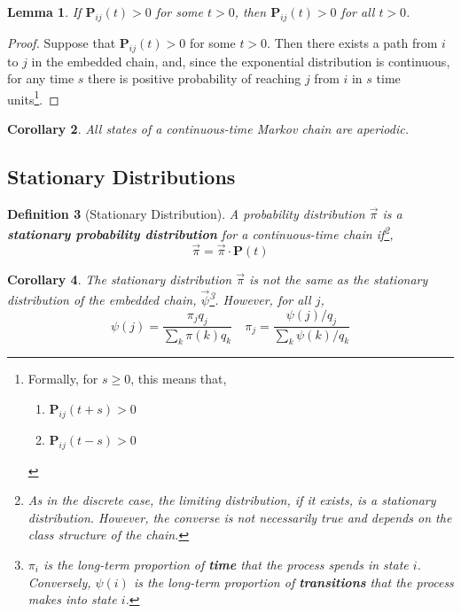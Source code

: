 \documentclass{tufte-handout}
\newtheorem{thm}{Theorem}
\newtheorem{cor}[thm]{Corollary}
\newtheorem{lem}[thm]{Lemma}
\newtheorem{defn}[thm]{Definition}
\begin{document}
\begin{lem}
  If $\mathbf{P}_{ij}(t) > 0$ for some $t > 0$, then $\mathbf{P}_{ij}(t) > 0$ for all $t > 0$.
\end{lem}

\begin{proof}
  Suppose that $\mathbf{P}_{ij}(t) > 0$ for some $t > 0$. Then there exists a path from $i$ to $j$ in the embedded chain, and, since the exponential distribution is continuous, for any time $s$ there is positive probability of reaching $j$ from $i$ in $s$ time units\footnote{Formally, for $s \geq 0$, this means that,
   \begin{enumerate}
    \item $\mathbf{P}_{ij}(t + s) > 0$
    \item $\mathbf{P}_{ij}(t - s) > 0$
  \end{enumerate}}. 
\end{proof}

\begin{cor}
  All states of a continuous-time Markov chain are aperiodic.
\end{cor}


\subsection{Stationary Distributions}
\begin{defn}[Stationary Distribution]
  A probability distribution $\Vec{\pi}$ is a \textbf{stationary probability distribution} for a continuous-time chain if\footnote{As in the discrete case, the limiting distribution, if it exists, is a stationary distribution. However, the converse is not necessarily true and depends on the class structure of the chain.},
  \[\Vec{\pi} = \Vec{\pi} \cdot \mathbf{P}(t)\]
\end{defn}

\begin{cor}
  The stationary distribution $\Vec{\pi}$ is not the same as the stationary distribution of the embedded chain, $\Vec{\psi}$\footnote{$\pi_i$ is the long-term proportion of \textbf{time} that the process spends in state $i$. Conversely, $\psi(i)$ is the long-term proportion of \textbf{transitions} that the process makes into state $i$.}. However, for all $j$, 
  \[\psi(j) = \frac{\pi_jq_j}{\sum_k \pi(k)q_k} \quad \pi_j = \frac{\psi(j) / q_j}{\sum_k \psi(k) / q_k}\]
\end{cor}
\end{document}
